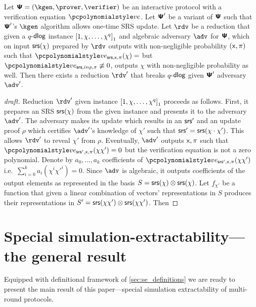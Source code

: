 \documentclass[runningheads,11pt]{llncs}
\begin{document}
\begin{lemma}
  Let $\ps = (\kgen, \prover, \verifier)$ be an interactive protocol with a
  verification equation $\vereq$. Let $\bm{\mathsf{\Psi}}'$ be a variant of $\bm{\mathsf{\Psi}}$ such that
  $\bm{\mathsf{\Psi}}'$'s $\kgen$ algorithm allows one-time SRS update. Let $\rdv$ be a
  reduction that given a $q$-$\mathsf{dlog}$ instance $\left[1, \chi, \ldots, \chi^q\right]_{1}$
  and algebraic adversary $\adv$ for $\bm{\mathsf{\Psi}}$, which on input $\mathsf{srs}(\chi)$ prepared
  by $\rdv$ outputs with non-negligible probability $(\mathsf{x}, \pi)$ such that
  $\vereq_{\srs, \inp, \zkproof}(\chi) = $ but
  $\vereq_{\srs, inp, \zkproof} \not\equiv 0$, outputs $\chi$ with
  non-negligible probability as well. Then there exists a reduction $\rdv'$ that
  breaks $q$-$\mathsf{dlog}$ given $\bm{\mathsf{\Psi}}'$ adversary $\adv'$.
\end{lemma}
\begin{proof}[draft]
  Reduction $\rdv'$ given instance $\left[1, \chi, \ldots, \chi^q\right]_{1}$ proceeds as
  follows. First, it prepares an SRS $\mathsf{srs}(\chi)$ from the given instance and
  presents it to the adversary $\adv'$. The adversary makes its update which
  results in an $\mathsf{srs}'$ and an update proof $\rho$ which certifies $\adv'$'s
  knowledge of $\chi'$ such that $\mathsf{srs}' = \mathsf{srs}(\chi \cdot \chi')$. This allows
  $\rdv'$ to reveal $\chi'$ from $\rho$. Eventually, $\adv'$ outputs
  $\mathsf{x}, \pi$ such that $\vereq_{\srs', \inp, \zkproof}(\chi \chi') = 0$
  but the verification equation is not a zero polynomial. Denote by
  $a_0, \ldots, a_k$ coefficients of
  $\vereq_{\srs', \inp, \zkproof}(\chi \chi')$
  i.e.~$\sum_{i = 0}^k a_i (\chi^i \chi'^i) = 0$. Since $\adv$ is algebraic, it
  outputs coefficients of the output elements as represented in the basis
  $S = \mathsf{srs}(\chi) \otimes \mathsf{srs}(\chi)$.  Let $f_{\chi'}$ be a function that given a
  linear combination of vectors' representations in $S$ produces their
  representations in $S' = \mathsf{srs}(\chi \chi') \otimes \mathsf{srs}(\chi \chi')$. Then 
\end{proof}



\color{black}

\section{Special simulation-extractability---the general result}
Equipped with definitional framework of \cref{sec:se_definitions} we are ready
to present the main result of this paper---special simulation extractability of
multi-round protocols.
\end{document}
